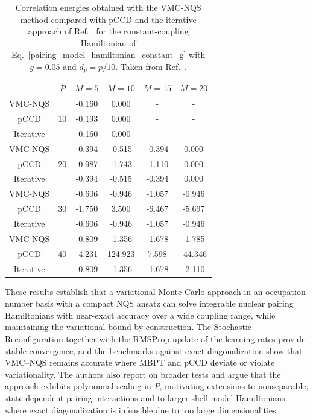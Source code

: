 \begin{table}[hbtp]
\begin{center}
\vspace{0.5cm}
\begin{tabular}{ c | c | c c c c }
\hline
\hline
& $P$ & $M=5$  & $M=10$ & $M=15$ & $M=20$ \\
\hline
VMC-NQS & \multirow{3}{*}{ 10 }  & -0.160 & 0.000 & - & - \\
pCCD &  & -0.193 & 0.000 & - &  -\\
Iterative &  & -0.160  & 0.000 & - & - \\
\hline
VMC-NQS & \multirow{3}{*}{ 20 }  & -0.394 & -0.515 & -0.394 & 0.000 \\
pCCD &   & -0.987 & -1.743 & -1.110 &  0.000 \\
Iterative &   & -0.394 & -0.515 & -0.394 &  0.000 \\
\hline
VMC-NQS & \multirow{3}{*}{ 30 }  & -0.606 & -0.946 & -1.057 & -0.946 \\
pCCD &   & -1.750 & 3.500 & -6.467 &  -5.697\\
Iterative &   & -0.606 & -0.946 & -1.057 & -0.946\\
\hline
VMC-NQS & \multirow{3}{*}{ 40 }  & -0.809 & -1.356 & -1.678 & -1.785 \\
pCCD &   & -4.231 & 124.923 & 7.598 &  -44.346 \\
Iterative &   & -0.809 & -1.356 & -1.678 & -2.110\\
\hline
\end{tabular}
\caption{Correlation energies obtained with the VMC-NQS method compared with pCCD and the iterative approach of Ref.~\cite{Guan:2022CoPhC} for the constant-coupling Hamiltonian of Eq.~\eqref{pairing_model_hamiltonian_constant_g} with $g = 0.05$ and $d_p=p/10$. Taken from Ref.~\cite{rigo2023}.}
\label{tab:g_constant_large}
\end{center}
\end{table}

These results establish that a variational Monte Carlo approach  in an occupation-number basis with a
compact NQS ansatz can solve integrable nuclear pairing Hamiltonians
with near-exact accuracy over a wide coupling range, while maintaining
the variational bound by construction. The Stochastic Reconfiguration together with the RMSProp update of the learning rates
provide stable convergence, and the benchmarks against exact
diagonalization show that VMC--NQS remains accurate where MBPT and
pCCD deviate or violate variationality. The authors also report on
broader tests and argue that the approach exhibits polynomial scaling
in $P$, motivating extensions to nonseparable, state-dependent pairing
interactions and to larger shell-model Hamiltonians where exact
diagonalization is infeasible due to too large dimensionalities.







